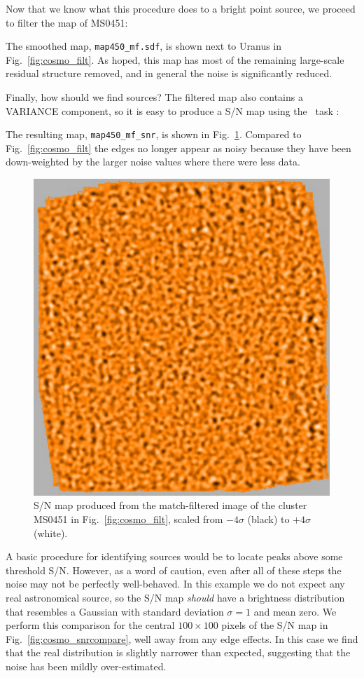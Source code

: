 \documentclass[twoside,11pt]{starlink}
\providecommand{\Kappa}{\xref{\textsc{Kappa}}{sun95}{}}
\providecommand{\task}[1]{\textsf{#1}}
\providecommand{\makesnr}{\xref{\task{makesnr}}{sun95}{MAKESNR}}
\begin{document}
Now that we know what this procedure does to a bright point source, we
proceed to filter the map of MS0451:

\begin{terminalv}
\end{terminalv}

The smoothed map, \texttt{map450\_mf.sdf}, is shown next to Uranus in
Fig.~\ref{fig:cosmo_filt}. As hoped, this map has most of the
remaining large-scale residual structure removed, and in general the
noise is significantly reduced.

Finally, how should we find sources? The filtered map also contains a
VARIANCE component, so it is easy to produce a S/N map using the \Kappa\
task \makesnr:

\begin{terminalv}
\end{terminalv}

The resulting map, \texttt{map450\_mf\_snr}, is shown in
Fig.~\ref{fig:cosmo_snr}. Compared to Fig.~\ref{fig:cosmo_filt} the
edges no longer appear as noisy because they have been down-weighted
by the larger noise values where there were less data.

\begin{figure}
\begin{center}
\includegraphics[width=0.49\linewidth]{sc19_cosmo_map_snr}
\caption{S/N map produced from the match-filtered image of the cluster
  MS0451 in Fig.~\ref{fig:cosmo_filt}, scaled from $-4\sigma$ (black)
  to $+4\sigma$ (white).}
\label{fig:cosmo_snr}
\end{center}
\end{figure}

A basic procedure for identifying sources would be to locate peaks
above some threshold S/N. However, as a word of caution, even after
all of these steps the noise may not be perfectly well-behaved. In
this example we do not expect any real astronomical source, so the S/N
map \emph{should\/} have a brightness distribution that resembles a
Gaussian with standard deviation $\sigma=1$ and mean zero. We perform
this comparison for the central $100 \times 100$ pixels of the S/N map
in Fig.~\ref{fig:cosmo_snrcompare}, well away from any edge
effects. In this case we find that the real distribution is slightly
narrower than expected, suggesting that the noise has been mildly
over-estimated.
\end{document}
